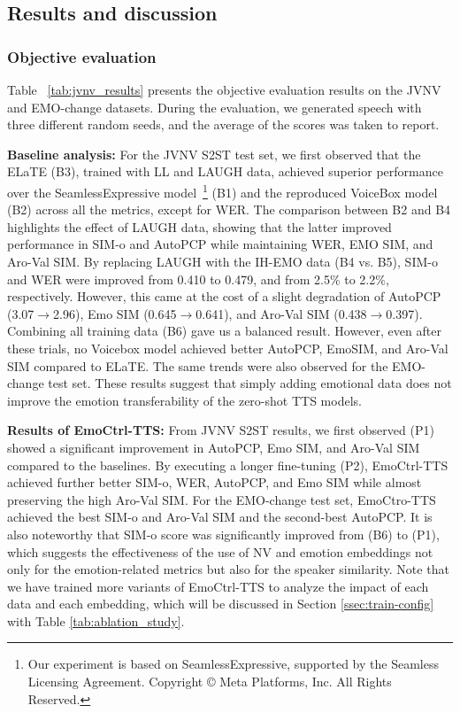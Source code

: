 \vspace{-.5em}
\subsection{Results and discussion}
\label{sec:results}
\vspace{-.5em}

\subsubsection{Objective evaluation}
\vspace{-.5em}

Table ~\ref{tab:jvnv_results} presents the objective evaluation results on the JVNV and EMO-change datasets. During the evaluation, we generated speech
with three different random seeds, and the average of the scores was taken to report.

{\bf Baseline analysis:} 
For the JVNV S2ST test set, we first observed that the ELaTE (B3), trained with LL and LAUGH data, achieved superior performance over the SeamlessExpressive model~\cite{barrault2023seamless}\footnote{Our experiment is based on SeamlessExpressive, supported by the Seamless Licensing Agreement. Copyright © Meta Platforms, Inc. All Rights Reserved.} (B1) and the reproduced VoiceBox model (B2) across all the metrics, except for WER.
The comparison between B2 and B4  highlights the effect of LAUGH data, showing that the latter improved performance in SIM-o and AutoPCP while maintaining WER, EMO SIM, and Aro-Val SIM.
By replacing LAUGH with the IH-EMO data (B4 vs. B5), SIM-o and WER were improved from 0.410 to 0.479, and from 2.5\% to 2.2\%, respectively. However, this came at the cost of a slight degradation of AutoPCP (3.07$\rightarrow$2.96),  Emo SIM (0.645$\rightarrow$0.641), and Aro-Val SIM (0.438$\rightarrow$0.397). 
Combining all training data (B6) gave us a balanced result.
However, even after these trials, no Voicebox model achieved better AutoPCP, EmoSIM, 
and Aro-Val SIM compared to ELaTE.
The same trends were also observed for the EMO-change test set.
These results suggest that simply adding emotional data does not improve the
emotion transferability of the zero-shot TTS models.

{\bf Results of EmoCtrl-TTS:}
From JVNV S2ST results, we first observed (P1) showed a significant improvement in AutoPCP, Emo SIM, and Aro-Val SIM compared to the baselines.
By executing a longer fine-tuning (P2), EmoCtrl-TTS 
achieved further better SIM-o, WER, AutoPCP, and Emo SIM while almost preserving the high Aro-Val SIM.
For the EMO-change test set, 
EmoCtro-TTS achieved the best SIM-o and Aro-Val SIM 
and the second-best AutoPCP.
It is also noteworthy that SIM-o score was significantly improved 
from (B6) to (P1), which suggests the effectiveness of the use of NV and emotion embeddings not only for the emotion-related metrics but also for the speaker similarity.
Note that we have trained more variants of EmoCtrl-TTS to analyze the impact of
each data and each embedding, which will be discussed in Section \ref{ssec:train-config} with Table \ref{tab:ablation_study}.

